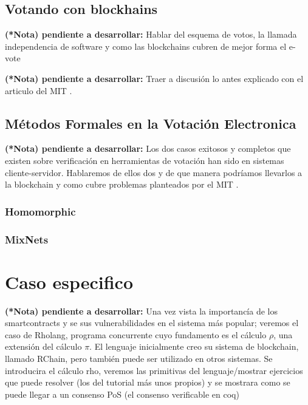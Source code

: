 \documentclass[14pt,letterpaper]{article}
\begin{document}
\subsection{Votando con blockhains}

{\small {\bf (*Nota) pendiente a desarrollar:} Hablar del esquema de votos, la
  llamada independencia de software y como las blockchains cubren de
  mejor forma el e-vote } \cite{votingScheme}\cite{BCEV}\cite{ETHVote}

{\small {\bf (*Nota) pendiente a desarrollar:} Traer a discusión lo antes explicado
con el articulo del MIT \cite{MIT}.}
           
\subsection{Métodos Formales en la Votación Electronica}

{\small {\bf (*Nota) pendiente a desarrollar:} Los dos casos exitosos y completos
  que existen sobre verificación en herramientas de votación han sido en sistemas
  cliente-servidor. Hablaremos de ellos dos y de que manera podríamos llevarlos a
  la blockchain y como cubre problemas planteados por el MIT}\cite{homotallying}
\cite{mixNets}\cite{MIT}.

\subsubsection{Homomorphic}
\subsubsection{MixNets}

\section{Caso especifico}

{\small {\bf (*Nota) pendiente a desarrollar:}
  Una vez vista la importancía de los smartcontracts y se sus vulnerabilidades en el
  sistema más popular; veremos el caso de Rholang, programa concurrente cuyo fundamento
  es el cálculo $\rho$, una extensión del cálculo $\pi$. El lenguaje inicialmente
  creo su sistema de blockchain, llamado RChain, pero también puede ser
  utilizado en otros sistemas. Se introducira el cálculo rho, veremos las primitivas
  del lenguaje/mostrar ejercicios que puede resolver (los del tutorial más unos propios)
  y se mostrara como se puede llegar a un consenso PoS (el consenso verificable en coq)}
\cite{rhoCalc}\cite{rhoLang}
\end{document}
